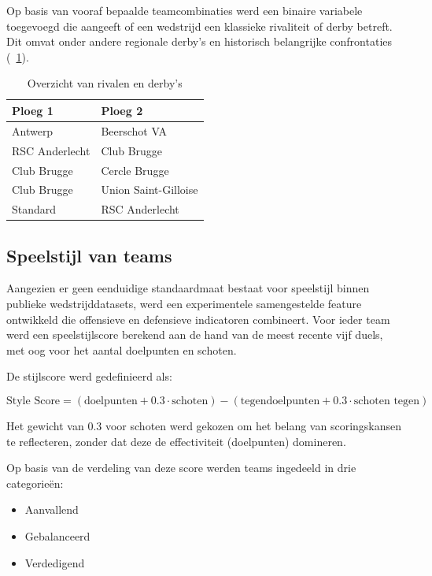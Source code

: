 Op basis van vooraf bepaalde teamcombinaties werd een binaire variabele toegevoegd die aangeeft of een wedstrijd een klassieke rivaliteit of derby betreft. 
Dit omvat onder andere regionale derby’s en historisch belangrijke confrontaties (~\ref{tab:riv_or_derby_pairs}).

\begin{table}[h]
\centering
\caption{Overzicht van rivalen en derby's}
\label{tab:riv_or_derby_pairs}
\begin{tabular}{ll}
\hline
\textbf{Ploeg 1} & \textbf{Ploeg 2} \\
\hline
Antwerp & Beerschot VA \\
RSC Anderlecht & Club Brugge \\
Club Brugge & Cercle Brugge \\
Club Brugge & Union Saint-Gilloise \\
Standard & RSC Anderlecht \\
\hline
\end{tabular}
\end{table}

\vspace{5pt}

\subsection{Speelstijl van teams}

Aangezien er geen eenduidige standaardmaat bestaat voor speelstijl binnen publieke wedstrijddatasets, 
werd een experimentele samengestelde feature ontwikkeld die offensieve en defensieve indicatoren combineert.
Voor ieder team werd een speelstijlscore berekend aan de hand van de meest recente vijf duels, met oog voor het aantal doelpunten en schoten.

De stijlscore werd gedefinieerd als:

\[
\text{Style Score} = (\text{doelpunten} + 0.3 \cdot \text{schoten}) - (\text{tegendoelpunten} + 0.3 \cdot \text{schoten tegen})
\]

Het gewicht van 0.3 voor schoten werd gekozen om het belang van scoringskansen te reflecteren, 
zonder dat deze de effectiviteit (doelpunten) domineren.

\vspace{5pt}

Op basis van de verdeling van deze score werden teams ingedeeld in drie categorieën:
\begin{itemize}
    \item Aanvallend
    \item Gebalanceerd
    \item Verdedigend
\end{itemize}

